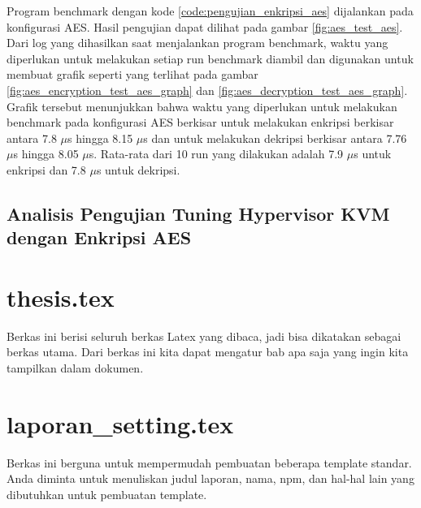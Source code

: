 Program benchmark dengan kode \ref{code:pengujian_enkripsi_aes} dijalankan pada konfigurasi AES. Hasil pengujian dapat dilihat pada gambar \ref{fig:aes_test_aes}. Dari log yang dihasilkan saat menjalankan program benchmark, waktu yang diperlukan untuk melakukan setiap run benchmark diambil dan digunakan untuk membuat grafik seperti yang terlihat pada gambar \ref{fig:aes_encryption_test_aes_graph} dan \ref{fig:aes_decryption_test_aes_graph}. Grafik tersebut menunjukkan bahwa waktu yang diperlukan untuk melakukan benchmark pada konfigurasi AES berkisar untuk melakukan enkripsi berkisar antara 7.8 $\mu$s hingga 8.15 $\mu$s dan untuk melakukan dekripsi berkisar antara 7.76 $\mu$s hingga 8.05 $\mu$s. Rata-rata dari 10 run yang dilakukan adalah 7.9 $\mu$s untuk enkripsi dan 7.8 $\mu$s untuk dekripsi.

\subsection{Analisis Pengujian Tuning Hypervisor KVM dengan Enkripsi AES}


\iffalse

    \section{thesis.tex}
    Berkas ini berisi seluruh berkas Latex yang dibaca, jadi bisa dikatakan sebagai
    berkas utama. Dari berkas ini kita dapat mengatur bab apa saja yang ingin
    kita tampilkan dalam dokumen.


    \section{laporan\_setting.tex}
    Berkas ini berguna untuk mempermudah pembuatan beberapa template standar.
    Anda diminta untuk menuliskan judul laporan, nama, npm, dan hal-hal lain yang
    dibutuhkan untuk pembuatan template.


